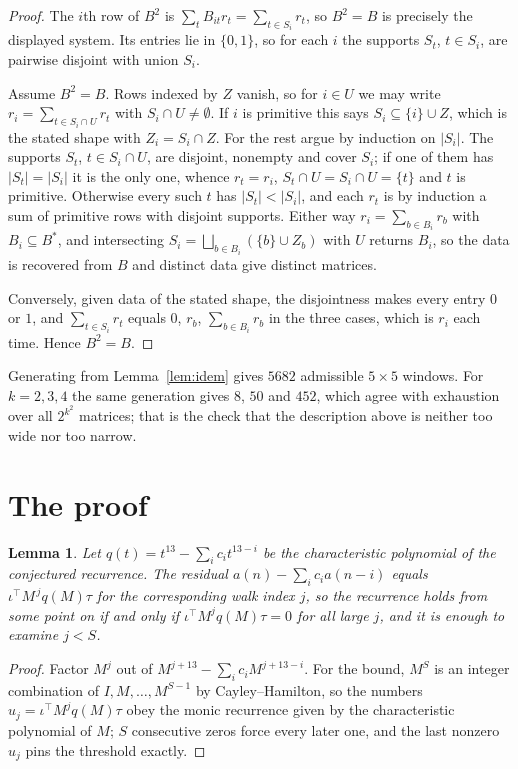 \documentclass[11pt,a4paper]{article}
\theoremstyle{plain}
\newtheorem{lemma}[theorem]{Lemma}
\theoremstyle{definition}
\begin{document}
\begin{proof}
The $i$th row of $B^2$ is $\sum_t B_{it}r_t=\sum_{t\in S_i}r_t$, so $B^2=B$ is precisely the
displayed system. Its entries lie in $\{0,1\}$, so for each $i$ the supports $S_t$,
$t\in S_i$, are pairwise disjoint with union $S_i$.

Assume $B^2=B$. Rows indexed by $Z$ vanish, so for $i\in U$ we may write
$r_i=\sum_{t\in S_i\cap U}r_t$ with $S_i\cap U\neq\emptyset$. If $i$ is primitive this says
$S_i\subseteq\{i\}\cup Z$, which is the stated shape with $Z_i=S_i\cap Z$. For the rest argue
by induction on $|S_i|$. The supports $S_t$, $t\in S_i\cap U$, are disjoint, nonempty and
cover $S_i$; if one of them has $|S_t|=|S_i|$ it is the only one, whence $r_t=r_i$,
$S_t\cap U=S_i\cap U=\{t\}$ and $t$ is primitive. Otherwise every such $t$ has
$|S_t|<|S_i|$, and each $r_t$ is by induction a sum of primitive rows with disjoint supports.
Either way $r_i=\sum_{b\in B_i}r_b$ with $B_i\subseteq B^{\ast}$, and intersecting
$S_i=\bigsqcup_{b\in B_i}(\{b\}\cup Z_b)$ with $U$ returns $B_i$, so the data is recovered
from $B$ and distinct data give distinct matrices.

Conversely, given data of the stated shape, the disjointness makes every entry $0$ or $1$, and
$\sum_{t\in S_i}r_t$ equals $0$, $r_b$, $\sum_{b\in B_i}r_b$ in the three cases, which is
$r_i$ each time. Hence $B^2=B$.
\end{proof}

Generating from Lemma~\ref{lem:idem} gives $5682$ admissible $5\times5$ windows. For
$k=2,3,4$ the same generation gives $8$, $50$ and $452$, which agree with exhaustion over all
$2^{k^2}$ matrices; that is the check that the description above is neither too wide nor too
narrow.

\section{The proof}

\begin{lemma}\label{lem:crit}
Let $q(t)=t^{13}-\sum_i c_it^{13-i}$ be the characteristic polynomial of the
conjectured recurrence. The residual $a(n)-\sum_ic_ia(n-i)$ equals
$\iota^{\!\top}M^{\,j}q(M)\tau$ for the corresponding walk index $j$, so the recurrence
holds from some point on if and only if $\iota^{\!\top}M^{j}q(M)\tau=0$ for all large $j$,
and it is enough to examine $j<S$.
\end{lemma}

\begin{proof}
Factor $M^{j}$ out of $M^{j+13}-\sum_ic_iM^{j+13-i}$. For the bound, $M^{S}$
is an integer combination of $I,M,\dots,M^{S-1}$ by Cayley--Hamilton, so the numbers
$u_j=\iota^{\!\top}M^{j}q(M)\tau$ obey the monic recurrence given by the characteristic
polynomial of $M$; $S$ consecutive zeros force every later one, and the last nonzero $u_j$
pins the threshold exactly.
\end{proof}
\end{document}
